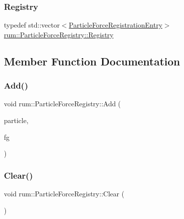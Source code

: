 \subsubsection{\texorpdfstring{Registry}{Registry}}
{\footnotesize\ttfamily typedef std\+::vector$<$\hyperlink{structrum_1_1_particle_force_registry_1_1_particle_force_registration_entry}{Particle\+Force\+Registration\+Entry}$>$ \hyperlink{classrum_1_1_particle_force_registry_a63b7b5a4c79dafe5b3658505c7ac1163}{rum\+::\+Particle\+Force\+Registry\+::\+Registry}\hspace{0.3cm}{\ttfamily [protected]}}



\subsection{Member Function Documentation}
\mbox{\label{classrum_1_1_particle_force_registry_a5465cbeb57e7f7d69a76d86650a96a1d}} 
\subsubsection{\texorpdfstring{Add()}{Add()}}
{\footnotesize\ttfamily void rum\+::\+Particle\+Force\+Registry\+::\+Add (\begin{DoxyParamCaption}\item[{\hyperlink{classrum_1_1_particle}{Particle} $\ast$}]{particle,  }\item[{\hyperlink{classrum_1_1_particle_force_generator}{Particle\+Force\+Generator} $\ast$}]{fg }\end{DoxyParamCaption})}

\mbox{\label{classrum_1_1_particle_force_registry_a24e4af625395c40b5f50c7efaf5ee028}} 
\subsubsection{\texorpdfstring{Clear()}{Clear()}}
{\footnotesize\ttfamily void rum\+::\+Particle\+Force\+Registry\+::\+Clear (\begin{DoxyParamCaption}{ }\end{DoxyParamCaption})}

